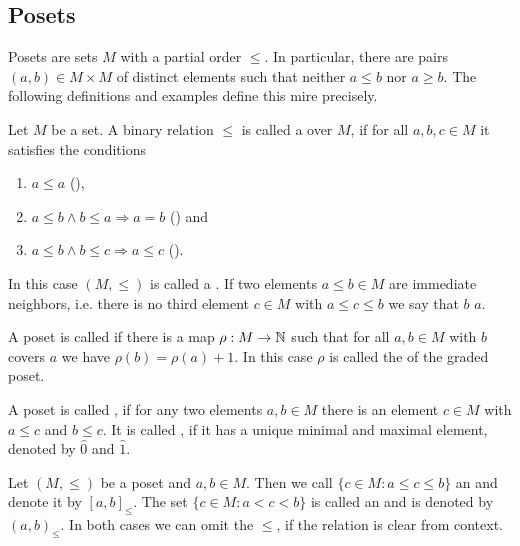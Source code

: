 \subsection{Posets}
\label{sec:posets}

Posets are sets $M$ with a partial order $\leq$. In particular, there are pairs $(a,b) \in M \times M$ of distinct elements such that neither $a \leq b$ nor $a \geq b$. The following definitions and examples define this mire precisely.

\begin{defi}
	Let $M$ be a set. A binary relation $\leq$ is called a  over $M$, if for all $a,b,c \in M$ it satisfies the conditions
	\begin{enumerate}
		\item $a \leq a$ (),
		\item $a \leq b \wedge b \leq a \Rightarrow a=b$ () and
		\item $a \leq b \wedge b \leq c \Rightarrow a \leq c$ ().
	\end{enumerate}
	In this case $(M,\leq)$ is called a . If two elements $a \leq b \in M$ are immediate neighbors, i.e. there is no third element $c \in M$ with $a \leq c \leq b$ we say that $b$  $a$.
\end{defi}

\begin{defi}
	A poset is called  if there is a map $\rho : M \to \mathbb{N}$ such that for all $a,b \in M$ with $b$ covers $a$ we have $\rho(b) = \rho(a) + 1$. In this case $\rho$ is called the  of the graded poset.
\end{defi}

\begin{defi}
	A poset is called , if for any two elements $a,b \in M$ there is an element $c \in M$ with $a \leq c$ and $b \leq c$. It is called , if it has a unique minimal and maximal element, denoted by $\hat 0$ and $\hat 1$.
\end{defi}

\begin{defi}
	Let $(M,\leq)$ be a poset and $a,b \in M$. Then we call $\{ c \in M : a \leq c \leq b \}$ an  and denote it by $[a,b]_\leq$. The set $\{ c \in M : a < c < b \}$ is called an  and is denoted by $(a,b)_\leq$. In both cases we can omit the $\leq$, if the relation is clear from context.
\end{defi}

